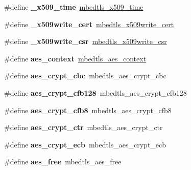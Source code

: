 \begin{DoxyCompactItemize}
\#define {\bfseries \+\_\+x509\+\_\+time}~\mbox{\hyperlink{structmbedtls__x509__time}{mbedtls\+\_\+x509\+\_\+time}}
\item 
\mbox{\label{compat-1_83_8h_ae15621c3d36107c32232a97ffeeffd80}} 
\#define {\bfseries \+\_\+x509write\+\_\+cert}~\mbox{\hyperlink{structmbedtls__x509write__cert}{mbedtls\+\_\+x509write\+\_\+cert}}
\item 
\mbox{\label{compat-1_83_8h_a17fc9e191bc42766864afe54b5b4c77a}} 
\#define {\bfseries \+\_\+x509write\+\_\+csr}~\mbox{\hyperlink{structmbedtls__x509write__csr}{mbedtls\+\_\+x509write\+\_\+csr}}
\item 
\mbox{\label{compat-1_83_8h_a8c4a6a2694a922cf58586e145ed5d0d0}} 
\#define {\bfseries aes\+\_\+context}~\mbox{\hyperlink{structmbedtls__aes__context}{mbedtls\+\_\+aes\+\_\+context}}
\item 
\mbox{\label{compat-1_83_8h_a8ef8a86792155968ca85f296800d33ac}} 
\#define {\bfseries aes\+\_\+crypt\+\_\+cbc}~mbedtls\+\_\+aes\+\_\+crypt\+\_\+cbc
\item 
\mbox{\label{compat-1_83_8h_a0e5ce79b793ba97983d460c0976ecc86}} 
\#define {\bfseries aes\+\_\+crypt\+\_\+cfb128}~mbedtls\+\_\+aes\+\_\+crypt\+\_\+cfb128
\item 
\mbox{\label{compat-1_83_8h_a3e229402492843bbfe82fe2552dd8a21}} 
\#define {\bfseries aes\+\_\+crypt\+\_\+cfb8}~mbedtls\+\_\+aes\+\_\+crypt\+\_\+cfb8
\item 
\mbox{\label{compat-1_83_8h_abe1a32f77b1e02009f1add93c5d4260f}} 
\#define {\bfseries aes\+\_\+crypt\+\_\+ctr}~mbedtls\+\_\+aes\+\_\+crypt\+\_\+ctr
\item 
\mbox{\label{compat-1_83_8h_aff93912add16a6f302fb81bd6d5c53dc}} 
\#define {\bfseries aes\+\_\+crypt\+\_\+ecb}~mbedtls\+\_\+aes\+\_\+crypt\+\_\+ecb
\item 
\mbox{\label{compat-1_83_8h_aedea1251edb0716007aa64411863a869}} 
\#define {\bfseries aes\+\_\+free}~mbedtls\+\_\+aes\+\_\+free
\item 
\mbox{\label{compat-1_83_8h_a01bcc53356cda9d36c45a7c3f8819424}} 

\end{DoxyCompactItemize}

